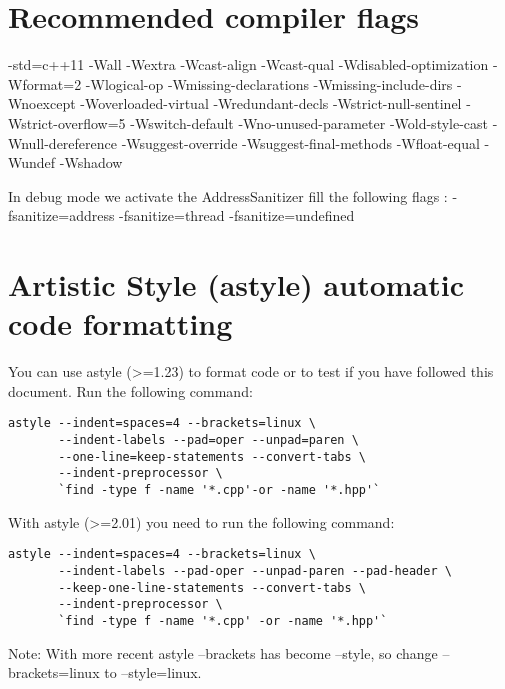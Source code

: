 \documentclass[a4paper,12pt]{article}
\begin{document}
\section{Recommended compiler flags}\label{sec:compiler_flags}
-std=c++11 -Wall -Wextra -Wcast-align -Wcast-qual -Wdisabled-optimization -Wformat=2 -Wlogical-op -Wmissing-declarations -Wmissing-include-dirs -Wnoexcept -Woverloaded-virtual -Wredundant-decls -Wstrict-null-sentinel -Wstrict-overflow=5 -Wswitch-default -Wno-unused-parameter -Wold-style-cast -Wnull-dereference -Wsuggest-override -Wsuggest-final-methods -Wfloat-equal -Wundef -Wshadow

In debug mode we activate the AddressSanitizer fill the following flags : -fsanitize=address -fsanitize=thread -fsanitize=undefined

\clearpage
\newpage
\section{Artistic Style (astyle) automatic code formatting}\label{sec:astyle}
You can use astyle (>=1.23) to format code or to test if you have followed this document. Run the following command:
\begin{lstlisting}[breaklines]
astyle --indent=spaces=4 --brackets=linux \
       --indent-labels --pad=oper --unpad=paren \
       --one-line=keep-statements --convert-tabs \
       --indent-preprocessor \
       `find -type f -name '*.cpp'-or -name '*.hpp'`
 \end{lstlisting}

With astyle (>=2.01) you need to run the following command:
\begin{lstlisting}[breaklines]
astyle --indent=spaces=4 --brackets=linux \
       --indent-labels --pad-oper --unpad-paren --pad-header \
       --keep-one-line-statements --convert-tabs \
       --indent-preprocessor \
       `find -type f -name '*.cpp' -or -name '*.hpp'`
 \end{lstlisting}

Note: With more recent astyle --brackets has become --style, so change --brackets=linux to --style=linux.
\end{document}
